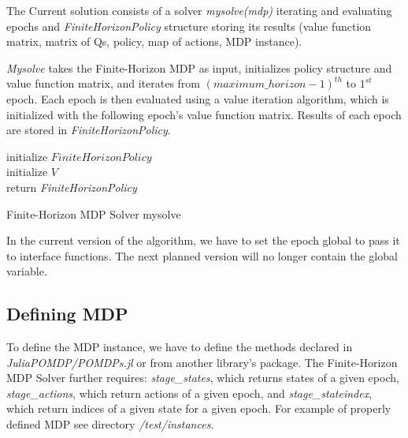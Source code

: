  The Current solution consists of a solver \textit{mysolve(mdp)} iterating and evaluating epochs and \textit{FiniteHorizonPolicy} structure storing its results (value function matrix, matrix of Qs, policy, map of actions, MDP instance). 
 
 
 \textit{Mysolve} takes the Finite-Horizon MDP as input, initializes policy structure and value function matrix, and iterates from \textit{$(maximum\_horizon-1)^{th}$} to \textit{$1^{st}$} epoch. Each epoch is then evaluated using a value iteration algorithm, which is initialized with the following epoch's value function matrix. Results of each epoch are stored in \textit{FiniteHorizonPolicy}.
 
 \LinesNumbered
\begin{algorithm}
\SetAlgoLined
initialize $FiniteHorizonPolicy$ \\
initialize $V$ \\
return \textit{FiniteHorizonPolicy}
\caption{Finite-Horizon MDP Solver mysolve}
\end{algorithm}

In the current version of the algorithm, we have to set the epoch global to pass it to interface functions. The next planned version will no longer contain the global variable.

\subsection{Defining MDP}

To define the MDP instance, we have to define the methods declared in \textit{JuliaPOMDP/POMDPs.jl} \cite{JMLR:v18:16-300} or from another library's package. The Finite-Horizon MDP Solver further requires: \textit{stage\_states}, which returns states of a given epoch, \textit{stage\_actions}, which return actions of a given epoch, and \textit{stage\_stateindex}, which return indices of a given state for a given epoch. For example of properly defined MDP see directory \textit{/test/instances}.
 

